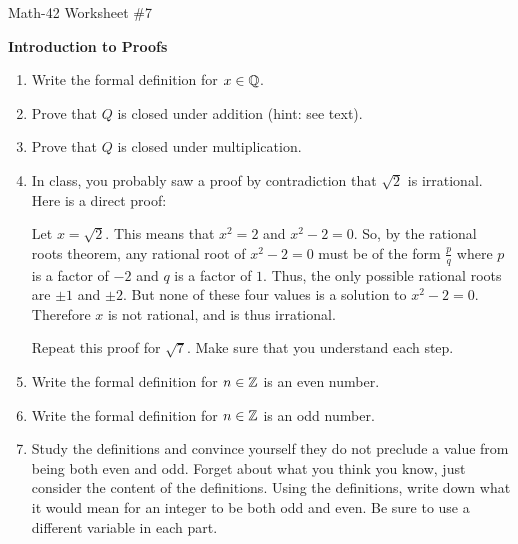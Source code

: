 \documentclass[letterpaper,12pt,fleqn]{article}
\begin{document}
\begin{center}
  \large Math-42 Worksheet \#7

  \textbf{Introduction to Proofs}
\end{center}

\vspace{0.5in}

\begin{enumerate}[left=0in,itemsep=0.5in]
\item Write the formal definition for \(x\in\mathbb{Q}\).

\item Prove that \(Q\) is closed under addition (hint: see text).

\item Prove that \(Q\) is closed under multiplication.

\item In class, you probably saw a proof by contradiction that \(\sqrt{2}\) is irrational.  Here is a direct proof:

  Let \(x=\sqrt{2}\).  This means that \(x^2=2\) and \(x^2-2=0\).  So, by the rational roots theorem, any rational
  root of \(x^2-2=0\) must be of the form \(\frac{p}{q}\) where \(p\) is a factor of \(-2\) and \(q\) is a factor of
  \(1\).  Thus, the only possible rational roots are \(\pm1\) and \(\pm2\).  But none of these four values is a
  solution to \(x^2-2=0\).  Therefore \(x\) is not rational, and is thus irrational.

  Repeat this proof for \(\sqrt{7}\).  Make sure that you understand each step.

\item Write the formal definition for \(n\in\mathbb{Z}\) is an even number.

\item Write the formal definition for \(n\in\mathbb{Z}\) is an odd number.

\item Study the definitions and convince yourself they do not preclude a value from being both even and odd.  Forget
  about what you think you know, just consider the content of the definitions.  Using the definitions, write down
  what it would mean for an integer to be both odd and even.  Be sure to use a different variable in each part.


\end{enumerate}
\end{document}
